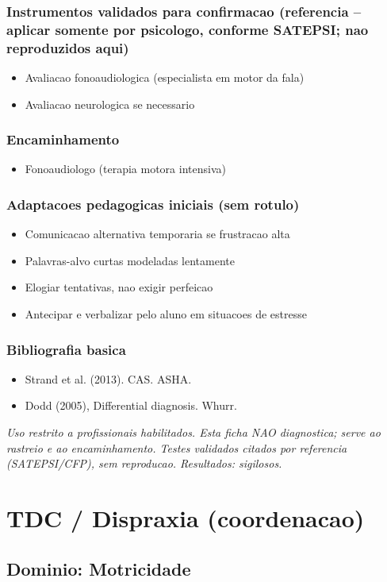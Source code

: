\documentclass[a4paper,11pt]{book}
\newcommand{\avisolegal}{\par\medskip\noindent\footnotesize\itshape
\color{cinza}Uso restrito a profissionais habilitados. Esta ficha NAO diagnostica;
serve ao rastreio e ao encaminhamento. Testes validados citados por referencia
(SATEPSI/CFP), sem reproducao. Resultados: sigilosos.\color{black}\par}
\begin{document}
\subsection*{Instrumentos validados para confirmacao (referencia -- aplicar somente por psicologo, conforme SATEPSI; nao reproduzidos aqui)}
\begin{itemize}
\item Avaliacao fonoaudiologica (especialista em motor da fala)
\item Avaliacao neurologica se necessario
\end{itemize}
\subsection*{Encaminhamento}
\begin{itemize}
\item Fonoaudiologo (terapia motora intensiva)
\end{itemize}
\subsection*{Adaptacoes pedagogicas iniciais (sem rotulo)}
\begin{itemize}
\item Comunicacao alternativa temporaria se frustracao alta
\item Palavras-alvo curtas modeladas lentamente
\item Elogiar tentativas, nao exigir perfeicao
\item Antecipar e verbalizar pelo aluno em situacoes de estresse
\end{itemize}
\subsection*{Bibliografia basica}
\begin{itemize}
\item Strand et al. (2013). CAS. ASHA.
\item Dodd (2005), Differential diagnosis. Whurr.
\end{itemize}
\avisolegal


\chapter{TDC / Dispraxia (coordenacao)}
\section*{Dominio: Motricidade}
\end{document}
